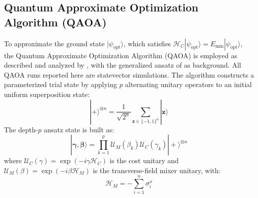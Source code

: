 \documentclass[review,12pt,times,authoryear]{elsarticle}
\theoremstyle{definition}
\begin{document}
\subsection{Quantum Approximate Optimization Algorithm (QAOA)}
To approximate the ground state $|\psi_{\mathrm{opt}}\rangle$, which satisfies $\mathcal{H}_C |\psi_{\mathrm{opt}}\rangle = E_{\min} |\psi_{\mathrm{opt}}\rangle$, the Quantum Approximate Optimization Algorithm (QAOA) is employed as described and analyzed by \citet{Zhou2020}, with the generalized ansatz of \citet{Hadfield2019} as background. All QAOA runs reported here are statevector simulations. The algorithm constructs a parameterized trial state by applying $p$ alternating unitary operators to an initial uniform superposition state:
\begin{equation}
  |+\rangle^{\otimes n} = \frac{1}{\sqrt{2^n}} \sum_{\bm{z} \in \{-1, 1\}^n} |\bm{z}\rangle
\end{equation}
The depth-$p$ ansatz state is built as:
\begin{equation}
  |\bm{\gamma}, \bm{\beta}\rangle = \prod_{k=1}^p \mathcal{U}_M(\beta_k) \mathcal{U}_C(\gamma_k) |+\rangle^{\otimes n}
\end{equation}
where $\mathcal{U}_C(\gamma) = \exp(-i \gamma \mathcal{H}_C)$ is the cost unitary and $\mathcal{U}_M(\beta) = \exp(-i \beta \mathcal{H}_M)$ is the transverse-field mixer unitary, with:
\begin{equation}
  \mathcal{H}_M = -\sum_{i=1}^n \sigma_i^x
\end{equation}
\end{document}
